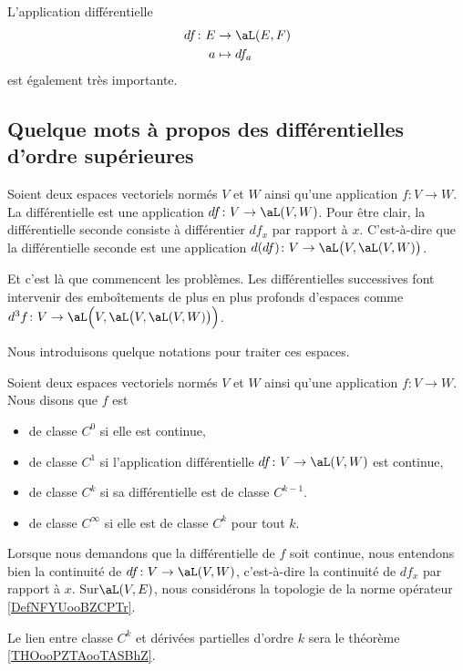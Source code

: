 L'application différentielle
\begin{equation}
	\begin{aligned}
		df\colon E & \to \aL(E,F) \\
		a          & \mapsto df_a
	\end{aligned}
\end{equation}
est également très importante.


\subsection{Quelque mots à propos des différentielles d'ordre supérieures}

Soient deux espaces vectoriels normés \( V\) et \( W\) ainsi qu'une application \( f\colon V\to W\). La différentielle est une application \( df\colon V\to \aL(V,W)\). Pour être clair, la différentielle seconde consiste à différentier \( df_x\) par rapport à \( x\). C'est-à-dire que la différentielle seconde est une application \( d(df)\colon V\to \aL\big( V,\aL(V,W) \big)\).

Et c'est là que commencent les problèmes. Les différentielles successives font intervenir des emboîtements de plus en plus profonds d'espaces comme \( d^3f\colon V\to \aL\Big( V,\aL\big( V,\aL(V,W) \big) \Big)\).

Nous introduisons quelque notations pour traiter ces espaces.

\begin{definition}  \label{DefPNjMGqy}
	Soient deux espaces vectoriels normés \( V\) et \( W\) ainsi qu'une application \( f\colon V\to W\). Nous disons que \( f\) est
	\begin{itemize}
		\item de classe  \( C^0\) si elle est continue,
		\item de classe \( C^1\) si l'application différentielle \( df\colon V\to \aL(V,W)\) est continue,
		\item de classe \( C^k\) si sa différentielle est de classe \( C^{k-1}\).
		\item de classe \( C^{\infty}\) si elle est de classe \( C^k\) pour tout \( k\).
	\end{itemize}

	Lorsque nous demandons que la différentielle de \( f\) soit continue, nous entendons bien la continuité de \( df\colon V\to \aL(V,W)\), c'est-à-dire la continuité de \( df_x\) par rapport à \( x\). Sur\( \aL(V,E)\), nous considérons la topologie de la norme opérateur \ref{DefNFYUooBZCPTr}.

\end{definition}
Le lien entre classe \( C^k\) et dérivées partielles d'ordre \( k\) sera le théorème \ref{THOooPZTAooTASBhZ}.


